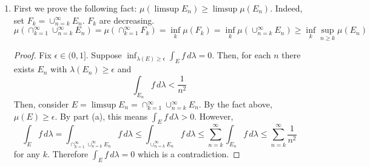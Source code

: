 \begin{enumerate}
\begin{enumerate}
		\item First we prove the following fact: $\mu( \limsup E_n) \ge \limsup \mu(E_n)$. Indeed, set $F_k = \cup_{n=k}^\infty E_n$. $F_k$ are decreasing.
	\[ \mu(\cap_{k=1}^\infty \cup_{n=k}^\infty E_n) = \mu(\cap_{k=1}^\infty F_k)= \inf_k \mu(F_k) = \inf_k \mu(\cup_{n=k}^\infty E_n) \ge \inf_k \sup_{n \ge k} \mu(E_n) \]
\begin{proof}
			Fix $\epsilon \in (0,1]$. Suppose $\displaystyle\inf_{\lambda(E) \ge \epsilon} \int_E f \, d\lambda = 0$. Then, for each $n$ there exists $E_n$ with $\lambda(E_n) \ge \epsilon$ and
				\[ \int_{E_n} f\, d\lambda <\dfrac{1}{n^2} \]
		Then, consider $E = \limsup E_n = \cap_{k=1}^\infty \cup_{n=k}^\infty E_n$. By the fact above, $\mu(E) \ge \epsilon$. By part (a), this means $\int_E f \, d\lambda>0$. However,
	\[ \int_E f \, d\lambda = \int_{\cap_{k=1}^\infty \cup_{n=k}^\infty E_n} f \, d\lambda \le \int_{\cup_{n=k}^\infty E_n} f \, d\lambda \le \sum_{n=k}^\infty \int_{E_n} f \, d\lambda \le \sum_{n=k}^\infty \dfrac 1{n^2} \]
for any $k$. Therefore $\int_E f \, d\lambda =0$ which is a contradiction.
		\end{proof}
	\end{enumerate}
\end{enumerate}